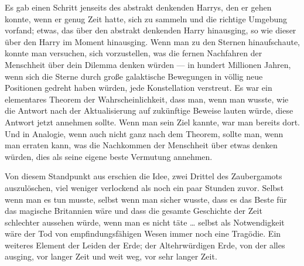 Es gab einen Schritt jenseits des abstrakt denkenden Harrys, den er gehen konnte, wenn er genug Zeit hatte, sich zu sammeln und die richtige Umgebung vorfand; etwas, das über den abstrakt denkenden Harry hinausging, so wie dieser über den Harry im Moment hinausging. Wenn man zu den Sternen hinaufschaute, konnte man versuchen, sich vorzustellen, was die fernen Nachfahren der Menschheit über dein Dilemma denken würden — in hundert Millionen Jahren, wenn sich die Sterne durch große galaktische Bewegungen in völlig neue Positionen gedreht haben würden, jede Konstellation verstreut. Es war ein elementares Theorem der Wahrscheinlichkeit, dass man, wenn man wusste, wie die Antwort nach der Aktualisierung auf zukünftige Beweise lauten würde, diese Antwort jetzt annehmen sollte. Wenn man sein Ziel kannte, war man bereits dort. Und in Analogie, wenn auch nicht ganz nach dem Theorem, sollte man, wenn man erraten kann, was die Nachkommen der Menschheit über etwas denken würden, dies als seine eigene beste Vermutung annehmen.

Von diesem Standpunkt aus erschien die Idee, zwei Drittel des Zaubergamots auszulöschen, viel weniger verlockend als noch ein paar Stunden zuvor. Selbst wenn man es tun musste, selbst wenn man sicher wusste, dass es das Beste für das magische Britannien wäre und dass die gesamte Geschichte der Zeit schlechter aussehen würde, wenn man es nicht täte … selbst als Notwendigkeit wäre der Tod von empfindungsfähigen Wesen immer noch eine Tragödie. Ein weiteres Element der Leiden der Erde; der Altehrwürdigen Erde, von der alles ausging, vor langer Zeit und weit weg, vor sehr langer Zeit.

